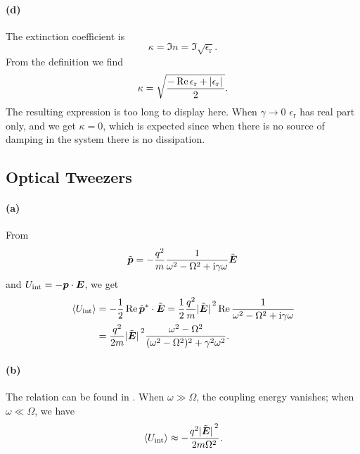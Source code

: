 \documentclass[hyperref, a4paper]{article}
\newcommand*{\ii}{\mathrm{i}}
\newcommand{\epsr}{\epsilon_{\text{r}}}
\begin{document}
\paragraph{(d)} The extinction coefficient is 
\begin{equation}
    \kappa = \Im n = \Im \sqrt{\epsr}.
\end{equation}
From the definition we find 
\begin{equation}
    \kappa = \sqrt{
        \frac{
            - \Re \epsr + \abs*{\epsr}
        }{2}
    }.
\end{equation}
The resulting expression is too long to display here.
When $\gamma \to 0$ $\epsr$ has real part only, and we get $\kappa = 0$,
which is expected since when there is no source of damping in the system 
there is no dissipation.

\subsection{Optical Tweezers}

\paragraph{(a)} From 
\begin{equation}
    \tilde{\vb*{p}} = - \frac{q^2}{m} \frac{1}{\omega^2 - \Omega^2 + \ii \gamma \omega} \tilde{\vb*{E}}
\end{equation}
and $U_{\text{int}} = - \vb*{p} \cdot \vb*{E}$,
we get 
\begin{equation}
    \begin{aligned}
        \expval*{U_{\text{int}}} &= - \frac{1}{2} \Re \tilde{\vb*{p}}^* \cdot \tilde{\vb*{E}}
        = \frac{1}{2} \frac{q^2}{m} \abs*{\tilde{\vb*{E}}}^2 \Re \frac{1}{
            \omega^2 - \Omega^2 + \ii \gamma \omega
        }  \\
        &= \frac{q^2}{2m} \abs*{\tilde{\vb*{E}}}^2 \frac{
            \omega^2 - \Omega^2
        }{(\omega^2 - \Omega^2)^2 + \gamma^2 \omega^2} .
    \end{aligned}
    \label{eq:u-int-omega-relation-dipole-coupling}
\end{equation}

\paragraph{(b)} The relation can be found in 
.
When $\omega \gg \Omega$, 
the coupling energy vanishes; 
when $\omega \ll \Omega$, we have 
\begin{equation}
    \expval*{U_{\text{int}}} \approx 
    - \frac{q^2 \abs*{\tilde{\vb*{E}}}^2}{2 m \Omega^2}.
\end{equation}
\end{document}
